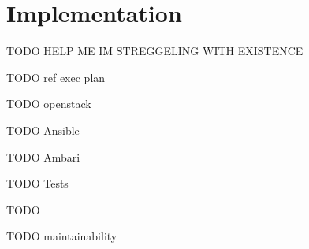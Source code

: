 \chapter{Implementation}
\label{chap:impl}

TODO HELP ME IM STREGGELING WITH EXISTENCE

TODO ref exec plan

TODO openstack

TODO Ansible

TODO Ambari

TODO Tests


TODO

TODO maintainability
